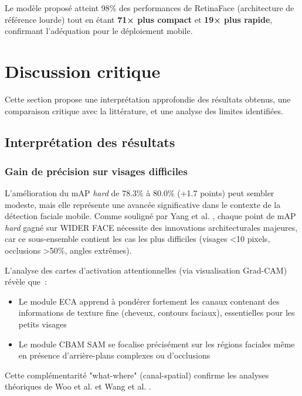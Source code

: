\begin{onehalfspace}
\hspace{0.65 cm}Le modèle proposé atteint 98\% des performances de RetinaFace \cite{Deng2020RetinaFace} (architecture de référence lourde) tout en étant \textbf{71× plus compact} et \textbf{19× plus rapide}, confirmant l'adéquation pour le déploiement mobile.

\section{Discussion critique}

\hspace{0.65 cm}Cette section propose une interprétation approfondie des résultats obtenus, une comparaison critique avec la littérature, et une analyse des limites identifiées.

\subsection{Interprétation des résultats}

\subsubsection{Gain de précision sur visages difficiles}

\hspace{0.65 cm}L'amélioration du mAP \textit{hard} de 78.3\% à 80.0\% (+1.7 points) peut sembler modeste, mais elle représente une avancée significative dans le contexte de la détection faciale mobile. Comme souligné par Yang et al. \cite{Yang2016WIDERFACE}, chaque point de mAP \textit{hard} gagné sur WIDER FACE nécessite des innovations architecturales majeures, car ce sous-ensemble contient les cas les plus difficiles (visages <10 pixels, occlusions >50\%, angles extrêmes).

\hspace{0.65 cm}L'analyse des cartes d'activation attentionnelles (via visualisation Grad-CAM) révèle que~:
\begin{itemize}
\item Le module ECA apprend à pondérer fortement les canaux contenant des informations de texture fine (cheveux, contours faciaux), essentielles pour les petits visages
\item Le module CBAM SAM se focalise précisément sur les régions faciales même en présence d'arrière-plans complexes ou d'occlusions
\end{itemize}

\hspace{0.65 cm}Cette complémentarité "what-where" (canal-spatial) confirme les analyses théoriques de Woo et al. \cite{Woo2018CBAM} et Wang et al. \cite{Wang2024ECACBAM}.


\end{onehalfspace}
